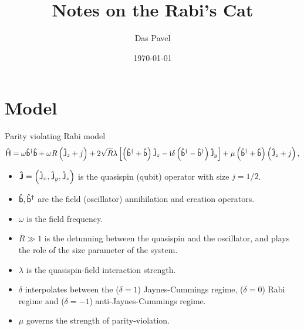 \documentclass[a4paper,11pt,twoside]{article}
\begin{document}
\title{Notes on the Rabi's Cat}
\date{\today}
\author{Das Pavel}

\maketitle
\section{Model}
	Parity violating Rabi model
	\begin{equation}
		\label{eq:H}
		\mathsf{\hat{H}}=
			\omega{\mathsf{\hat{b}}}^{\dagger}\mathsf{\hat{b}}+\omega R\left(\mathsf{\hat{J}}_{z}+j\right)
			+2\sqrt{R}\lambda\left[\left({\mathsf{\hat{b}}}^{\dagger}+\mathsf{\hat{b}}\right)\mathsf{\hat{J}}_{z}-\mathrm{i}\delta\left({\mathsf{\hat{b}}}^{\dagger}-{\mathsf{\hat{b}}}^{\dagger}\right)\mathsf{\hat{J}}_{y}\right]
			+\mu\left({\mathsf{\hat{b}}}^{\dagger}+\mathsf{\hat{b}}\right)\left(\mathsf{\hat{J}}_{z}+j\right),
	\end{equation}
	\begin{itemize}
		\item
			$\boldsymbol{\mathsf{\hat{J}}}=\left(\mathsf{\hat{J}}_{x},\mathsf{\hat{J}}_{y},\mathsf{\hat{J}}_{z}\right)$ is the quasispin (qubit) operator with size $j=1/2$.

		\item 
			$\mathsf{\hat{b}},{\mathsf{\hat{b}}}^{\dagger}$ are the field (oscillator) annihilation and creation operators.

		\item 
			$\omega$ is the field frequency.

		\item
			$R\gg1$ is the detunning between the quasispin and the oscillator, and plays the role of the size parameter of the system.

		\item 
			$\lambda$ is the quasispin-field interaction strength. 

		\item
			$\delta$ interpolates between the ($\delta=1$) Jaynes-Cummings regime, ($\delta=0$) Rabi regime and ($\delta=-1$) anti-Jaynes-Cummings regime.

		\item
			$\mu$ governs the strength of parity-violation.
	\end{itemize}
\end{document}
